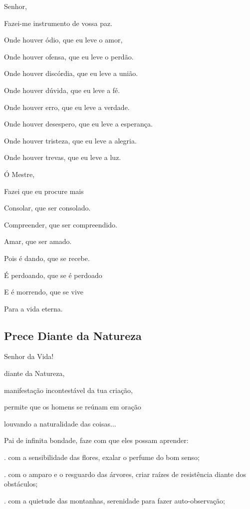 \documentclass[12pt,a4paper]{article}
\begin{document}
			Senhor,

			Fazei-me instrumento de vossa paz.

			Onde houver \'odio, que eu leve o amor,

			Onde houver ofensa, que eu leve o perd\~ao.

			Onde houver disc\'ordia, que eu leve a uni\~ao.

			Onde houver d\'uvida, que eu leve a f\'e.

			Onde houver erro, que eu leve a verdade.

			Onde houver desespero, que eu leve a esperan\c{c}a.

			Onde houver tristeza, que eu leve a alegria.

			Onde houver trevas, que eu leve a luz.

			\'O Mestre,

			Fazei que eu procure mais

			Consolar, que ser consolado.

			Compreender, que ser compreendido.

			Amar, que ser amado.

			Pois \'e dando, que se recebe.

			\'E perdoando, que se \'e perdoado

			E \'e morrendo, que se vive

			Para a vida eterna.

		\subsection{Prece Diante da Natureza}
			\begin{flushright}
			\end{flushright}

			Senhor da Vida!

			diante da Natureza,

			manifesta\c{c}\~ao incontest\'avel da tua cria\c{c}\~ao,

			permite que os homens se re\'unam em ora\c{c}\~ao

			louvando a naturalidade das coisas...

			Pai de infinita bondade, faze com que eles possam aprender:

			. com a sensibilidade das flores, exalar o perfume do bom senso;

			. com o amparo e o resguardo das \'arvores, criar ra\'izes de resist\^encia diante dos obst\'aculos;

			. com a quietude das montanhas, serenidade para fazer auto-observa\c{c}\~ao;
\end{document}
